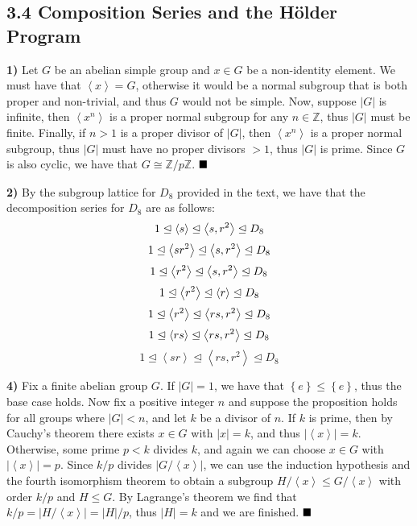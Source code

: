 \documentclass[12pt]{article}
\newcommand{\Z}{\mathbb{Z}}
\newcommand{\angleb}[1]{\left\langle#1\right\rangle}
\newcommand{\braceb}[1]{\left\{#1\right\}}
\newcommand{\vertb}[1]{\left\vert#1\right\vert}
\newcommand{\normsub}{\trianglelefteq}
\newcommand{\done}{\ensuremath{\strut\hfill\blacksquare}}
\begin{document}
\subsection*{3.4 Composition Series and the H\"older Program}

\textbf{1)}
Let \( G \) be an abelian simple group and \( x \in G \) be a non-identity
element.
We must have that \( \angleb{x} = G \), otherwise it would be a normal subgroup
that is both proper and non-trivial, and thus \( G \) would not be simple.
Now, suppose \( \vertb{G} \) is infinite, then \( \angleb{x^n} \) is a proper
normal subgroup for any \( n \in \Z \), thus \( \vertb{G} \) must be finite.
Finally, if \( n > 1 \) is a proper divisor of \( \vertb{G} \), then
\( \angleb{x^n} \) is a proper normal subgroup, thus \( \vertb{G} \) must
have no proper divisors \( > 1 \), thus \( \vertb{G} \) is prime.
Since \( G \) is also cyclic, we have that \( G \cong \Z/p\Z \).
\done

\textbf{2)}
By the subgroup lattice for \( D_8 \) provided in the text, we have that the
decomposition series for \( D_8 \) are as follows:
\[
	1 \normsub \angleb{s} \normsub \angleb{s,r^2} \normsub D_8 \\
\]
\[
	1 \normsub \angleb{sr^2} \normsub \angleb{s,r^2} \normsub D_8 \\
\]
\[
	1 \normsub \angleb{r^2} \normsub \angleb{s,r^2} \normsub D_8 \\
\]
\[
	1 \normsub \angleb{r^2} \normsub \angleb{r} \normsub D_8 \\
\]
\[
	1 \normsub \angleb{r^2} \normsub \angleb{rs,r^2} \normsub D_8 \\
\]
\[
	1 \normsub \angleb{rs} \normsub \angleb{rs,r^2} \normsub D_8 \\
\]
\[
	1 \normsub \angleb{sr} \normsub \angleb{rs,r^2} \normsub D_8
\]

\textbf{4)}
Fix a finite abelian group \( G \).
If \( \vertb{G} = 1 \), we have that \( \braceb{e} \leq \braceb{e} \), thus the
base case holds.
Now fix a positive integer \( n \) and suppose the proposition holds for all
groups where \( \vertb{G} < n \), and let \( k \) be a divisor of \( n \).
If \( k \) is prime, then by Cauchy's theorem there exists \( x \in G \) with
\( \vertb{x} = k \), and thus \( \vertb{\angleb{x}} = k \).
Otherwise, some prime \( p < k \) divides \( k \), and again we can choose
\( x \in G \) with \( \vertb{\angleb{x}} = p \).
Since \( k/p \) divides \( \vertb{G/\angleb{x}} \), we can use the induction
hypothesis and the fourth isomorphism theorem to obtain a subgroup
\( H/\angleb{x} \leq G/\angleb{x} \) with order \( k/p \) and \( H \leq G \).
By Lagrange's theorem we find that
\( k/p = \vertb{H/\angleb{x}} = \vertb{H}/p \), thus \( \vertb{H} = k \) and we
are finished.
\done
\end{document}
